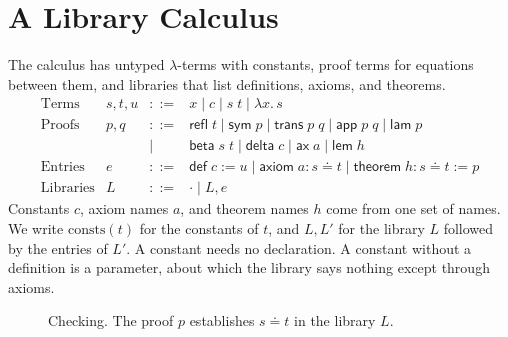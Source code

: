 \documentclass[acmsmall,nonacm,screen]{acmart}
\newcommand{\eqd}{\doteq}
\newcommand{\kw}[1]{\mathsf{#1}}
\newcommand{\chk}[4]{#1 \vdash #2 : #3 \eqd #4}
\newcommand{\consts}{\mathrm{consts}}
\begin{document}
\section{A Library Calculus}
\label{sec:calculus}

The calculus has untyped $\lambda$-terms with constants, proof terms for equations between
them, and libraries that list definitions, axioms, and theorems.
\[
\begin{array}{llcl}
\text{Terms} & s, t, u & ::= & x \mid c \mid s\;t \mid \lambda x.\,s \\
\text{Proofs} & p, q & ::= & \kw{refl}\;t \mid \kw{sym}\;p \mid \kw{trans}\;p\;q \mid
  \kw{app}\;p\;q \mid \kw{lam}\;p \\
 & & \mid & \kw{beta}\;s\;t \mid \kw{delta}\;c \mid \kw{ax}\;a \mid \kw{lem}\;h \\
\text{Entries} & e & ::= & \kw{def}\;c := u \mid \kw{axiom}\;a : s \eqd t \mid
  \kw{theorem}\;h : s \eqd t := p \\
\text{Libraries} & L & ::= & \cdot \mid L, e
\end{array}
\]
Constants $c$, axiom names $a$, and theorem names $h$ come from one set of names. We write
$\consts(t)$ for the constants of $t$, and $L, L'$ for the library $L$ followed by the entries of
$L'$. A constant needs no declaration. A constant without a definition is a parameter, about
which the library says nothing except through axioms.

\begin{figure}
\caption{Checking. The proof $p$ establishes $s \eqd t$ in the library $L$.}
\label{fig:chk}
\end{figure}
\end{document}
